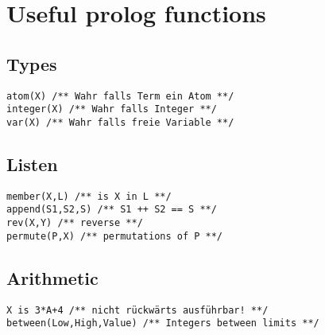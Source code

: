 \appendix\section{Useful prolog functions}
\subsection{Types}
\begin{verbatim}
atom(X) /** Wahr falls Term ein Atom **/
integer(X) /** Wahr falls Integer **/
var(X) /** Wahr falls freie Variable **/
\end{verbatim}
\subsection{Listen}
\begin{verbatim}
member(X,L) /** is X in L **/
append(S1,S2,S) /** S1 ++ S2 == S **/
rev(X,Y) /** reverse **/
permute(P,X) /** permutations of P **/
\end{verbatim}
\subsection{Arithmetic}
\begin{verbatim}
X is 3*A+4 /** nicht rückwärts ausführbar! **/
between(Low,High,Value) /** Integers between limits **/  
\end{verbatim}